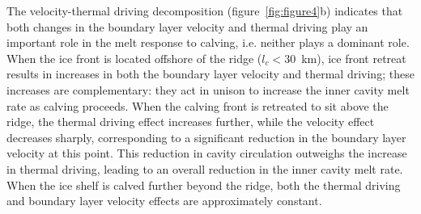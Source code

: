 \documentclass[draft]{agujournal2019}
\begin{document}
The velocity-thermal driving decomposition (figure~\ref{fig:figure4}b) indicates that both changes in the boundary layer velocity and thermal driving play an important role in the melt response to calving, i.e. neither plays a dominant role.  When the ice front is located offshore of the ridge ($l_c < 30$~km), ice front retreat results in increases in both the boundary layer velocity and thermal driving; these increases are complementary: they act in unison to increase the inner cavity melt rate as calving proceeds. When the calving front is retreated to sit above the ridge, the thermal driving effect increases further, while the velocity effect decreases sharply, corresponding to a significant reduction in the boundary layer velocity at this point. This reduction in cavity circulation outweighs the increase in thermal driving, leading to an overall reduction in the inner cavity melt rate. When the ice shelf is calved further beyond the ridge, both the thermal driving and boundary layer velocity effects are approximately constant.
\end{document}
